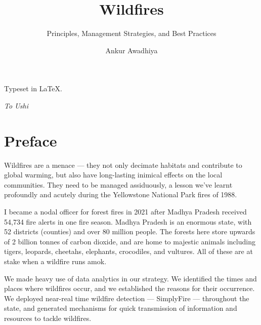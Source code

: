 \documentclass[
  12 pt,
]{Nemilov}
\title{Wildfires}
\subtitle{Principles, Management Strategies, and Best Practices}
\author{Ankur Awadhiya}
\date{}
\begin{document}
\maketitle

\thispagestyle{empty}
\null\vfill
\noindent


Typeset in \LaTeX.

\newpage

\vspace*{\fill}

\begin{center}
\emph{\Large{To Ushi}}
\end{center}

\vspace*{\fill}

\cleardoublepage


\setlength{\abovedisplayskip}{-5pt}
\setlength{\abovedisplayshortskip}{-5pt}

{
\setcounter{tocdepth}{1}
\tableofcontents
}
\listoffigures
\listoftables
\chapter*{Preface}\label{preface}


Wildfires are a menace --- they not only decimate habitats and contribute to global warming, but also have long-lasting inimical effects on the local communities. They need to be managed assiduously, a lesson we've learnt profoundly and acutely during the Yellowstone National Park fires of 1988.

I became a nodal officer for forest fires in 2021 after Madhya Pradesh received 54,734 fire alerts in one fire season. Madhya Pradesh is an enormous state, with 52 districts (counties) and over 80 million people. The forests here store upwards of 2 billion tonnes of carbon dioxide, and are home to majestic animals including tigers, leopards, cheetahs, elephants, crocodiles, and vultures. All of these are at stake when a wildfire runs amok.

We made heavy use of data analytics in our strategy. We identified the times and places where wildfires occur, and we established the reasons for their occurrence. We deployed near-real time wildfire detection --- SimplyFire --- throughout the state, and generated mechanisms for quick transmission of information and resources to tackle wildfires.
\end{document}
